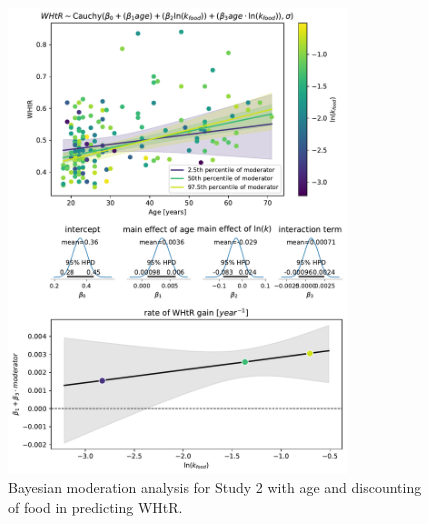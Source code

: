 \documentclass[12pt, a4paper]{article}
\begin{document}
\begin{figure} 
	\centering
	\includegraphics[width=0.8\textwidth]{analysis/study2 whtr~age*food.pdf} 
	\caption{Bayesian moderation analysis for Study 2 with age and discounting of food in predicting WHtR.}
	\label{fig:s2_whtr_food}
\end{figure}


\end{document}
